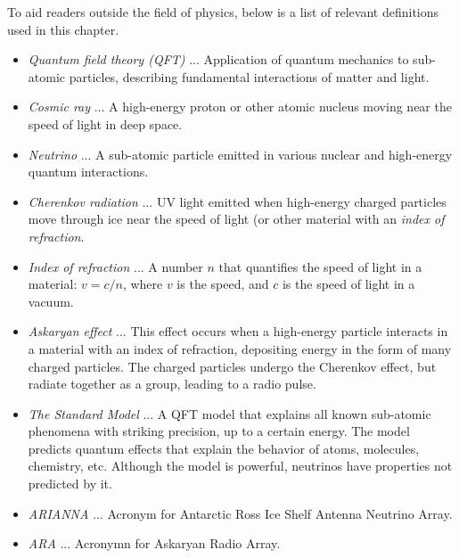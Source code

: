 \documentclass[../../main.tex]{subfiles}
\begin{document}
To aid readers outside the field of physics, below is a list of relevant definitions used in this chapter.
\begin{itemize}
\item \textit{Quantum field theory (QFT)} ... Application of quantum mechanics to sub-atomic particles, describing fundamental interactions of matter and light.
\item \textit{Cosmic ray} ... A high-energy proton or other atomic nucleus moving near the speed of light in deep space.
\item \textit{Neutrino} ... A sub-atomic particle emitted in various nuclear and high-energy quantum interactions.
\item \textit{Cherenkov radiation} ... UV light emitted when high-energy charged particles move through ice near the speed of light (or other material with an \textit{index of refraction}.
\item \textit{Index of refraction} ... A number $n$ that quantifies the speed of light in a material: $v = c/n$, where $v$ is the speed, and $c$ is the speed of light in a vacuum.
\item \textit{Askaryan effect} ... This effect occurs when a high-energy particle interacts in a material with an index of refraction, depositing energy in the form of many charged particles.  The charged particles undergo the Cherenkov effect, but radiate together as a group, leading to a radio pulse. 
\item \textit{The Standard Model} ... A QFT model that explains all known sub-atomic phenomena with striking precision, up to a certain energy.  The model predicts quantum effects that explain the behavior of atoms, molecules, chemistry, etc.  Although the model is powerful, neutrinos have properties not predicted by it.
\item \textit{ARIANNA} ... Acronym for Antarctic Ross Ice Shelf Antenna Neutrino Array.
\item \textit{ARA} ... Acronymn for Askaryan Radio Array.
\end{itemize}
\end{document}
